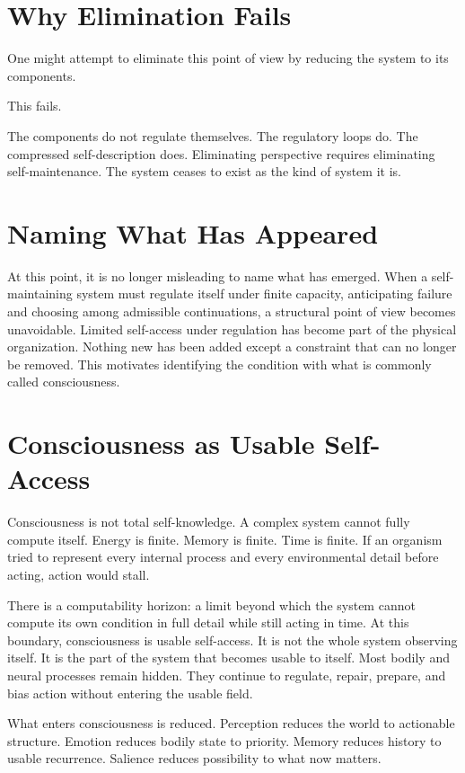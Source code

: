 \documentclass[11pt,twoside,openright]{book}
\begin{document}
\section*{Why Elimination Fails}

One might attempt to eliminate this point of view by reducing the system to its components.

This fails.

The components do not regulate themselves. The regulatory loops do. The compressed self-description does. Eliminating perspective requires eliminating self-maintenance. The system ceases to exist as the kind of system it is.

\section*{Naming What Has Appeared}

At this point, it is no longer misleading to name what has emerged. When a self-maintaining system must regulate itself under finite capacity, anticipating failure and choosing among admissible continuations, a structural point of view becomes unavoidable. Limited self-access under regulation has become part of the physical organization. Nothing new has been added except a constraint that can no longer be removed. This motivates identifying the condition with what is commonly called consciousness.

\section*{Consciousness as Usable Self-Access}

Consciousness is not total self-knowledge. A complex system cannot fully compute itself. Energy is finite. Memory is finite. Time is finite. If an organism tried to represent every internal process and every environmental detail before acting, action would stall.

There is a computability horizon: a limit beyond which the system cannot compute its own condition in full detail while still acting in time. At this boundary, consciousness is usable self-access. It is not the whole system observing itself. It is the part of the system that becomes usable to itself. Most bodily and neural processes remain hidden. They continue to regulate, repair, prepare, and bias action without entering the usable field.

What enters consciousness is reduced. Perception reduces the world to actionable structure. Emotion reduces bodily state to priority. Memory reduces history to usable recurrence. Salience reduces possibility to what now matters.
\end{document}
